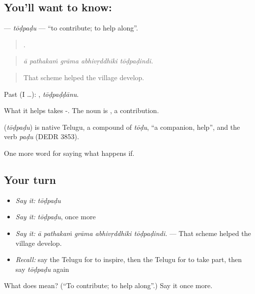 \subsection*{You'll want to know: }
\textbf{} — \emph{tōḍpaḍu} — \textquotedblleft{}to contribute; to help along\textquotedblright{}.

\begin{quote}
    .
\end{quote}

\begin{quote}
\emph{ā pathakaṁ grāma abhivṛddhiki tōḍpaḍindi.}
\end{quote}

\begin{quote}
That scheme helped the village develop.
\end{quote}

Past (I …): , \emph{tōḍpaḍḍānu}.

What it helps takes -. The noun is , a contribution.

\begin{cousinweb}
\textbf{} (\emph{tōḍpaḍu}) is native Telugu, a compound of \emph{tōḍu}, \textquotedblleft{}a companion, help\textquotedblright{}, and the verb \emph{paḍu} (DEDR 3853).
\end{cousinweb}

\begin{grammarlens}[title={What you've built}]
One more word for saying what happens if.
\end{grammarlens}

\subsection*{Your turn}
\begin{itemize}
\raggedright
  \item \emph{Say it:} \emph{tōḍpaḍu}
  \item \emph{Say it:} \emph{tōḍpaḍu}, once more
  \item \emph{Say it:} \emph{ā pathakaṁ grāma abhivṛddhiki tōḍpaḍindi.} — That scheme helped the village develop.
  \item \emph{Recall:} say the Telugu for to inspire, then the Telugu for to take part, then say \emph{tōḍpaḍu} again
\end{itemize}

\begin{tcolorbox}[breakable,colback=teal!4,colframe=teal!35!black,title={Before you move on}]
What does  mean? (\textquotedblleft{}To contribute; to help along\textquotedblright{}.) Say it once more.
\end{tcolorbox}
